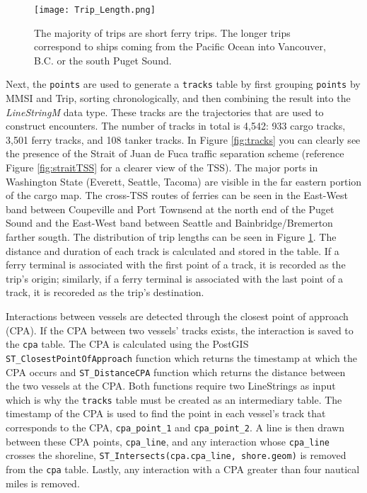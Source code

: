 \documentclass[twoside,symmetric,notoc]{tufte-book}
\begin{document}
\begin{figure}
        \centering
    	\texttt{[image: Trip\_Length.png]}
	    \caption{The majority of trips are short ferry trips. The longer trips correspond to ships coming from the Pacific Ocean into Vancouver, B.C. or the south Puget Sound.}
    	\label{fig:tripLength}
    	\forcerectofloat
\end{figure}
\par{%
Next, the \texttt{points} are used to generate a \texttt{tracks} table by first grouping \texttt{points} by MMSI and Trip, sorting chronologically, and then combining the result into the \textit{LineStringM} data type. These tracks are the trajectories that are used to construct encounters. The number of tracks in total is 4,542: 933 cargo tracks, 3,501 ferry tracks, and 108 tanker tracks. In Figure \ref{fig:tracks} you can clearly see the presence of the Strait of Juan de Fuca traffic separation scheme (reference Figure \ref{fig:straitTSS} for a clearer view of the TSS). The major ports in Washington State (Everett, Seattle, Tacoma) are visible in the far eastern portion of the cargo map. The cross-TSS routes of ferries can be seen in the East-West band between Coupeville and Port Townsend at the north end of the Puget Sound and the East-West band between Seattle and Bainbridge/Bremerton farther sougth. The distribution of trip lengths can be seen in Figure \ref{fig:tripLength}. The distance and duration of each track is calculated and stored in the table. If a ferry terminal is associated with the first point of a track, it is recorded as the trip's origin; similarly, if a ferry terminal is associated with the last point of a track, it is recoreded as the trip's destination.
}
\par{%
Interactions between vessels are detected through the closest point of approach (CPA). If the CPA between two vessels' tracks exists, the interaction is saved to the \texttt{cpa} table. The CPA is calculated using the PostGIS \texttt{ST_ClosestPointOfApproach} function which returns the timestamp at which the CPA occurs and \texttt{ST_DistanceCPA} function which returns the distance between the two vessels at the CPA. Both functions require two LineStrings as input which is why the \texttt{tracks} table must be created as an intermediary table. The timestamp of the CPA is used to find the point in each vessel's track that corresponds to the CPA, \texttt{cpa_point_1} and \texttt{cpa_point_2}. A line is then drawn between these CPA points, \texttt{cpa_line}, and any interaction whose \texttt{cpa_line} crosses the shoreline, \texttt{ST_Intersects(cpa.cpa_line, shore.geom)} is removed from the \texttt{cpa} table. Lastly, any interaction with a CPA greater than four nautical miles is removed.
}
\end{document}
